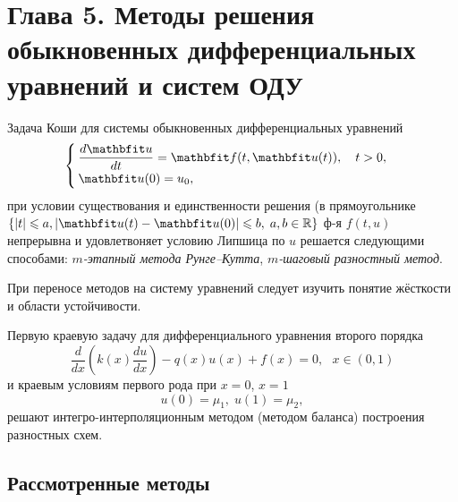 \newpage
{}
\pagestyle{empty}
\vspace{0.5cm}

\section*{Глава 5. Методы решения обыкновенных дифференциальных уравнений и систем ОДУ}

Задача Коши для системы обыкновенных дифференциальных уравнений
\begin{equation}
%
    \label{Koshi_sys}
    \begin{cases}
        \dfrac{d\vfunc{u}}{dt} = \vfunc{f}(t, \vfunc{u}(t)), \quad t > 0, \\
        \vfunc{u}(0) = u_0,
    \end{cases}
\end{equation}
при условии существования и единственности решения (в прямоугольнике $\{|t| \leqslant a, | \vfunc{u}(t)-\vfunc{u}(0)| \leqslant b,\; a, b\in\mathbb{R}\}$ ф-я $f(t, u)$ непрерывна и удовлетвоняет условию Липшица по $u$ решается следующими способами: \textit{$m$-этапный метода Рунге--Кутта}, \textit{ $m$-шаговый разностный метод}.

При переносе методов на систему уравнений следует изучить понятие жёсткости и области устойчивости.
 
Первую краевую задачу для дифференциального уравнения второго порядка
\begin{equation}
    \label{eq:2-ord-eq}
    \dfrac{d}{dx}\left(k(x)\dfrac{du}{dx}\right) - q(x)u(x) + f(x) = 0, ~~~x\in(0,1)
\end{equation}
%
и краевым условиям первого рода при $x=0$, $x=1$
%
\begin{equation}
    \label{eq:2-ord-eq-bounds}
    u(0) = \mu_1,\;u(1) = \mu_2,
\end{equation}
%
решают интегро-интерполяционным методом (методом баланса) построения разностных схем.

\subsection{Рассмотренные методы}